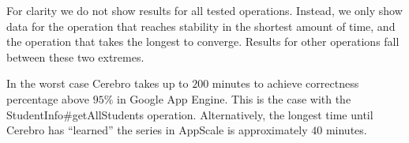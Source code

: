 For clarity we do not show results for all tested operations. Instead,
we only show data for the operation that reaches stability in the shortest
amount of time,
and the operation that takes the longest to converge.
Results for other operations fall between these two extremes.

In the worst case Cerebro takes up to $200$ minutes to 
achieve correctness percentage above $95\%$
in Google App Engine. This is the case with the
StudentInfo\#getAllStudents operation. 
Alternatively, the longest time until Cerebro has ``learned'' the series in
AppScale is approximately $40$ minutes.


